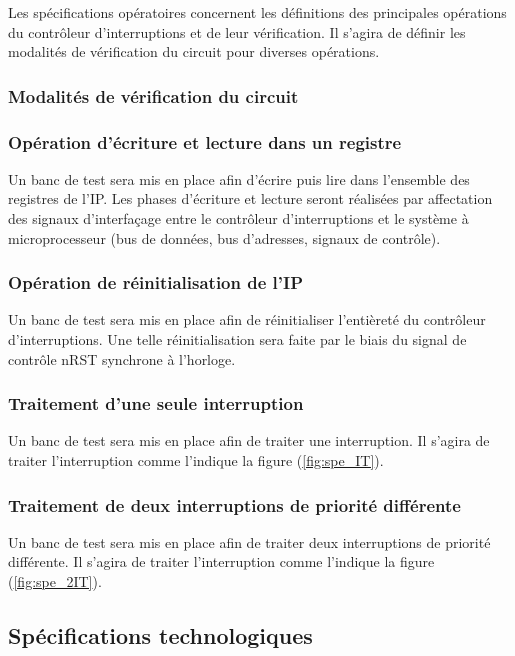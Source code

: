 Les spécifications opératoires concernent les définitions des principales opérations du contrôleur d'interruptions et de leur vérification.
Il s'agira de définir les modalités de vérification du circuit pour diverses opérations.

\subsubsection{Modalités de vérification du circuit}

\subsubsection*{Opération d'écriture et lecture dans un registre}

Un banc de test sera mis en place afin d'écrire puis lire dans l'ensemble des registres de l'IP.
Les phases d'écriture et lecture seront réalisées par affectation des signaux d'interfaçage entre le contrôleur d'interruptions et le système à microprocesseur (bus de données, bus d'adresses, signaux de contrôle).

\subsubsection*{Opération de réinitialisation de l'IP}

Un banc de test sera mis en place afin de réinitialiser l'entièreté du contrôleur d'interruptions.
Une telle réinitialisation sera faite par le biais du signal de contrôle nRST synchrone à l'horloge.

\subsubsection*{Traitement d'une seule interruption}

Un banc de test sera mis en place afin de traiter une interruption.
Il s'agira de traiter l'interruption comme l'indique la figure (\ref{fig:spe_IT}).

\subsubsection*{Traitement de deux interruptions de priorité différente}

Un banc de test sera mis en place afin de traiter deux interruptions de priorité différente.
Il s'agira de traiter l'interruption comme l'indique la figure (\ref{fig:spe_2IT}).

\subsection{Spécifications technologiques}

